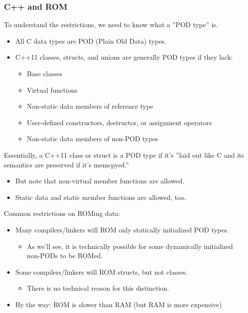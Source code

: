 \subsubsection{C++ and ROM}
To understand the restrictions, we need to know what a ''POD type'' is.
\begin{itemize}
  \item All C data types are POD (Plain Old Data) types.
  \item C++11 classes, structs, and unions are generally POD types if they lack:
  \begin{itemize}
    \item Base classes
    \item Virtual functions
    \item Non-static data members of reference type
    \item User-defined constructors, destructor, or assignment operators
    \item Non-static data members of non-POD types
  \end{itemize}
\end{itemize}
Essentially, a C++11 class or struct is a POD type if it's ''laid out like C and its semantics are preserved if it's memcpyed.''
\begin{itemize}
  \item But note that non-virtual member functions are allowed.
  \item Static data and static member functions are allowed, too.
\end{itemize}

Common restrictions on ROMing data:
\begin{itemize}
  \item Many compilers/linkers will ROM only statically initialized POD types.
  \begin{itemize}
    \item As we'll see, it is technically possible for some dynamically initialized non-PODs to be ROMed.
  \end{itemize}
  \item Some compilers/linkers will ROM structs, but not classes.
  \begin{itemize}
    \item There is no technical reason for this distinction.
  \end{itemize}
  \item By the way: ROM is slower than RAM (but RAM is more expensive)
\end{itemize}

